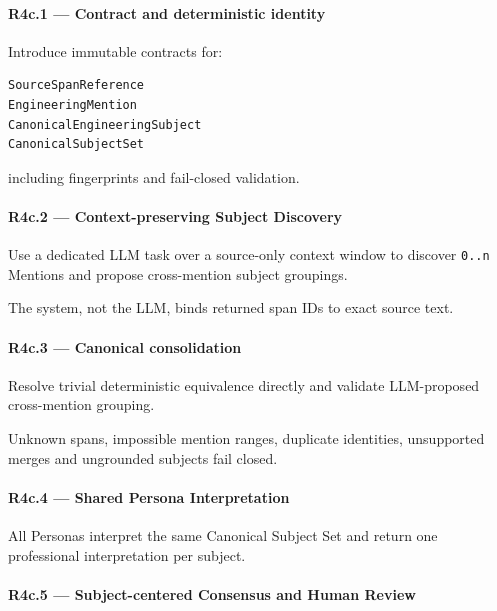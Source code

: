 \hypertarget{r4c1--contract-and-deterministic-identity}{%
\paragraph{R4c.1 --- Contract and deterministic identity}\label{r4c1--contract-and-deterministic-identity}}

Introduce immutable contracts for:

\begin{verbatim}
SourceSpanReference
EngineeringMention
CanonicalEngineeringSubject
CanonicalSubjectSet
\end{verbatim}

including fingerprints and fail-closed validation.

\hypertarget{r4c2--context-preserving-subject-discovery}{%
\paragraph{R4c.2 --- Context-preserving Subject Discovery}\label{r4c2--context-preserving-subject-discovery}}

Use a dedicated LLM task over a source-only context window to discover \texttt{0..n} Mentions and propose cross-mention subject groupings.

The system, not the LLM, binds returned span IDs to exact source text.

\hypertarget{r4c3--canonical-consolidation}{%
\paragraph{R4c.3 --- Canonical consolidation}\label{r4c3--canonical-consolidation}}

Resolve trivial deterministic equivalence directly and validate LLM-proposed cross-mention grouping.

Unknown spans, impossible mention ranges, duplicate identities, unsupported merges and ungrounded subjects fail closed.

\hypertarget{r4c4--shared-persona-interpretation}{%
\paragraph{R4c.4 --- Shared Persona Interpretation}\label{r4c4--shared-persona-interpretation}}

All Personas interpret the same Canonical Subject Set and return one professional interpretation per subject.

\hypertarget{r4c5--subject-centered-consensus-and-human-review}{%
\paragraph{R4c.5 --- Subject-centered Consensus and Human Review}\label{r4c5--subject-centered-consensus-and-human-review}}


